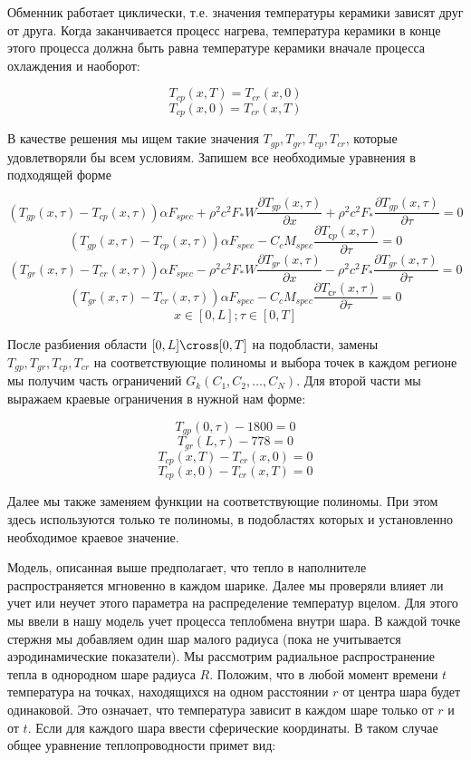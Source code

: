 \documentclass[a4paper,12pt]{article}
\begin{document}
Обменник работает циклически, т.е. значения температуры керамики
зависят друг от друга. Когда заканчивается процесс нагрева,
температура керамики в конце этого процесса должна быть равна
температуре керамики вначале процесса охлаждения и наоборот:

$$T_{cp}(x,T) = T_{cr}(x,0)$$
$$T_{cp}(x,0) = T_{cr}(x,T)$$

В качестве решения мы ищем такие значения
$T_{gp}, T_{gr}, T_{cp},T_{cr}$, которые удовлетворяли бы всем условиям.  Запишем все
необходимые уравнения в подходящей форме

$$(T_{gp}(x,\tau) - T_{cp}(x,\tau)) \alpha F_{spec} + \rho^2 c^2 F_* W\frac{\partial T_{gp}(x,\tau)}{\partial x} + \rho^2 c^2 F_*\frac{\partial T_{gp}(x,\tau)}{\partial \tau} = 0$$
$$(T_{gp}(x,\tau) - T_{cp}(x,\tau))\alpha F_{spec} -  C_c M_{spec} \frac{\partial T_{сp}(x,\tau)}{\partial \tau} = 0$$
$$(T_{gr}(x,\tau) - T_{cr}(x,\tau)) \alpha F_{spec} - \rho^2 c^2 F_* W\frac{\partial T_{gr}(x,\tau)}{\partial x} - \rho^2 c^2 F_*\frac{\partial T_{gr}(x,\tau)}{\partial \tau} = 0$$
$$(T_{gr}(x,\tau) - T_{cr}(x,\tau))\alpha F_{spec} -  C_c M_{spec} \frac{\partial T_{сr}(x,\tau)}{\partial \tau} = 0$$
$$x \in [0, L]; \tau \in [0, T]$$

После разбиения области $[0,L] \cross [0,T]$ на подобласти,
замены $T_{gp}, T_{gr}, T_{cp}, T_{cr}$ на соответствующие полиномы
и выбора точек в каждом регионе мы получим часть
ограничений $G_k(C_1,C_2,\ldots,C_N)$. Для второй части мы выражаем
краевые ограничения в нужной нам форме:

$$T_{gp}(0,\tau) - 1800 = 0$$
$$T_{gr}(L,\tau) - 778 = 0$$
$$T_{cp}(x,T) - T_{cr}(x,0) = 0$$
$$T_{cp}(x,0) - T_{cr}(x,T) = 0$$

Далее мы также заменяем функции на соответствующие полиномы. При этом
здесь используются только те полиномы, в подобластях которых и
установленно необходимое краевое значение.

Модель, описанная выше предполагает, что тепло в наполнителе
распространяется мгновенно в каждом шарике. Далее мы проверяли влияет
ли учет или неучет этого параметра на распределение температур вцелом.
Для этого мы ввели в нашу модель учет процесса теплобмена внутри
шара. В каждой точке стержня мы добавляем один шар малого радиуса
(пока не учитывается аэродинамические показатели).  Мы рассмотрим
радиальное распространение тепла в однородном шаре
радиуса $R$. Положим, что в любой момент времени $t$ температура
на точках, находящихся на одном расстоянии $r$ от центра шара будет
одинаковой. Это означает, что температура зависит в каждом шаре только
от $r$ и от $t$. Если для каждого шара ввести сферические
координаты. В таком случае общее уравнение теплопроводности примет
вид:
\end{document}
